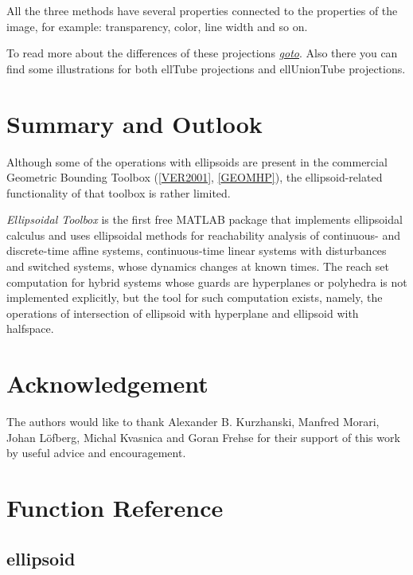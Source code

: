 \documentclass[letterpaper,10pt,english]{sphinxmanual}
\begin{document}
All the three methods have several properties connected to the properties of the image, for example: transparency, color, line width and so on.

To read more about the differences of these projections {\hyperref[chap_implement:goto-label]{\emph{goto}}}. Also there you can find some illustrations for both ellTube projections and ellUnionTube projections.


\chapter{Summary and Outlook}
\label{chap_summary::doc}\label{chap_summary:summary-and-outlook}
Although some of the operations with ellipsoids are present in the
commercial Geometric Bounding Toolbox ({\hyperref[chap_summary:ver2001]{{[}VER2001{]}}}, {\hyperref[chap_summary:geomhp]{{[}GEOMHP{]}}}),
the ellipsoid-related functionality of that
toolbox is rather limited.

\emph{Ellipsoidal Toolbox} is the first free MATLAB package that implements
ellipsoidal calculus and uses ellipsoidal methods for reachability
analysis of continuous- and discrete-time affine systems,
continuous-time linear systems with disturbances and switched systems,
whose dynamics changes at known times. The reach set computation for
hybrid systems whose guards are hyperplanes or polyhedra is not
implemented explicitly, but the tool for such computation exists,
namely, the operations of intersection of ellipsoid with hyperplane and
ellipsoid with halfspace.


\chapter{Acknowledgement}
\label{chap_acknowledge::doc}\label{chap_acknowledge:acknowledgement}
The authors would like to thank Alexander B. Kurzhanski, Manfred Morari,
Johan Löfberg, Michal Kvasnica and Goran Frehse for their support of
this work by useful advice and encouragement.


\chapter{Function Reference}
\label{chap_functions::doc}\label{chap_functions:function-reference}

\section{ellipsoid}
\label{chap_functions:ellipsoid}
\end{document}
